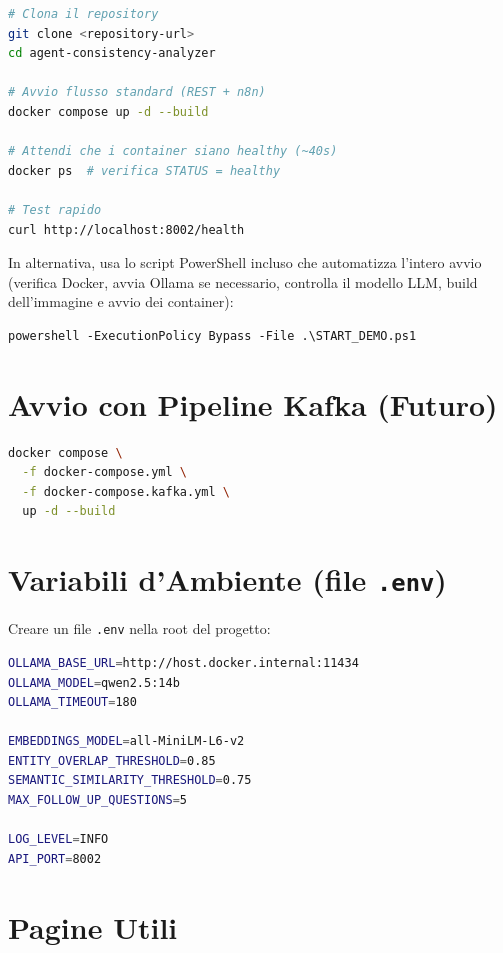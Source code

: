 \documentclass[12pt,a4paper]{report}
\begin{document}
\begin{lstlisting}[language=bash]
# Clona il repository
git clone <repository-url>
cd agent-consistency-analyzer

# Avvio flusso standard (REST + n8n)
docker compose up -d --build

# Attendi che i container siano healthy (~40s)
docker ps  # verifica STATUS = healthy

# Test rapido
curl http://localhost:8002/health
\end{lstlisting}

In alternativa, usa lo script PowerShell incluso che automatizza l'intero avvio
(verifica Docker, avvia Ollama se necessario, controlla il modello LLM,
build dell'immagine e avvio dei container):
\begin{lstlisting}[language={}]
powershell -ExecutionPolicy Bypass -File .\START_DEMO.ps1
\end{lstlisting}

\section{Avvio con Pipeline Kafka (Futuro)}

\begin{lstlisting}[language=bash]
docker compose \
  -f docker-compose.yml \
  -f docker-compose.kafka.yml \
  up -d --build
\end{lstlisting}

\section{Variabili d'Ambiente (file \texttt{.env})}

Creare un file \texttt{.env} nella root del progetto:

\begin{lstlisting}[language=bash]
OLLAMA_BASE_URL=http://host.docker.internal:11434
OLLAMA_MODEL=qwen2.5:14b
OLLAMA_TIMEOUT=180

EMBEDDINGS_MODEL=all-MiniLM-L6-v2
ENTITY_OVERLAP_THRESHOLD=0.85
SEMANTIC_SIMILARITY_THRESHOLD=0.75
MAX_FOLLOW_UP_QUESTIONS=5

LOG_LEVEL=INFO
API_PORT=8002
\end{lstlisting}

\section{Pagine Utili}
\end{document}
